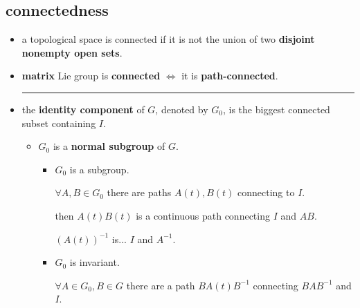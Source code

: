 \subsection{connectedness}
\begin{itemize}
	\item a topological space is connected if it is not the union of two \textbf{disjoint nonempty open sets}.
	
	\item \textbf{matrix} Lie group is \textbf{connected} $\iff$ it is \textbf{path-connected}.
	
	\noindent\rule[0.5ex]{\linewidth}{0.5pt} %
	
	\item the \textbf{identity component} of $G$, denoted by $G_0$, is the biggest connected subset containing $I$.
	\begin{itemize}
		\item $G_0$ is a \textbf{normal subgroup} of $G$.
		
		\begin{tcolorbox}[title=proof:]
			\begin{itemize}
				\item $G_0$ is a subgroup.
				
				$\forall A, B \in G_0$ there are paths $A(t), B(t)$ connecting to $I$.
				
				then $A(t) B(t)$ is a continuous path connecting $I$ and $A B$.
				
				$(A(t))^{- 1}$ is... $I$ and $A^{- 1}$.
				
				\item $G_0$ is invariant.
				
				$\forall A \in G_0, B \in G$ there are a path $B A(t) B^{- 1}$ connecting $B A B^{- 1}$ and $I$.
			\end{itemize}
		\end{tcolorbox}
	\end{itemize}
\end{itemize}

